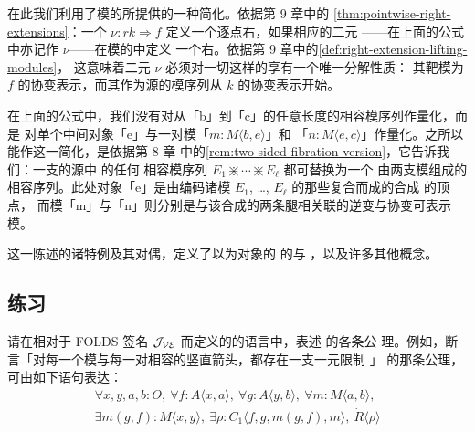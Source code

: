 \begin{example}
在此我们利用了模的\trVirtualEquipment{}所提供的一种简化。依据第 9 章中的%
\cref{thm:pointwise-right-extensions}：一个\trNaturalTransformation{}
$\nu\colon rk\Rightarrow f$ 定义一个逐点右\trExtension，如果相应的二元%
\trCell{}——在上面的公式中亦记作 $\nu$——在模的\trVirtualEquipment{}中定义
一个右\trExtension。依据第 9 章中的\cref{def:right-extension-lifting-modules}，
这意味着二元\trCell{} $\nu$ 必须对一切这样的\trCell{}享有一个唯一分解性质：
其靶模为 $f$ 的协变表示，而其作为源的模序列从 $k$ 的协变表示开始。

在上面的公式中，我们没有对从「b」到「c」的任意长度的相容模序列作量化，而是
对单个中间对象「e」与一对模「$m\colon M\langle b,e\rangle$」和
「$n\colon M\langle e,c\rangle$」作量化。之所以能作这一简化，是依据第 8 章
中的\cref{rem:two-sided-fibration-version}，它告诉我们：一支\trCell{}的源中
的任何
相容模序列 $E_{1}\divideontimes\cdots\divideontimes E_{\ell}$ 都可替换为一个
由两支模组成的相容序列。此处对象「e」是由编码诸模
$E_{1}$, \ldots, $E_{\ell}$ 的那些\trSpan{}复合而成的合成%
\trTwoSidedFibration{}的顶点，
而模「m」与「n」则分别是与该合成\trSpan{}的两条腿相关联的逆变与协变可表示模。
\end{example}

这一陈述的诸特例及其对偶，定义了以\trInfinityCategories{}为对象的\trDiagram{}%
的\trLimit{}与%
\trColimit，以及许多其他概念。

\subsection*{练习}

\begin{exercise}\label{ex:folds-axioms}
请在相对于 FOLDS 签名 $\mathcal{J}_{\mathcal{VE}}$ 而定义的\trVirtualEquipment{}的语言中，表述%
\trVirtualEquipment{}的各条公
理。例如，断言「对每一个模与每一对相容的竖直箭头，都存在一支一元限制%
\trCell」
的那条公理，可由如下语句表达：
\begin{equation*}
\begin{gathered}
\forall x,y,a,b\colon O,\ \forall f\colon A\langle x,a\rangle,\ \forall g\colon A\langle y,b\rangle,\ \forall m\colon M\langle a,b\rangle,\\
\exists m(g,f)\colon M\langle x,y\rangle,\ \exists\rho\colon C_{1}\langle f,g,m(g,f),m\rangle,\ \dot{R}\langle\rho\rangle
\end{gathered}
\end{equation*}
\end{exercise}

